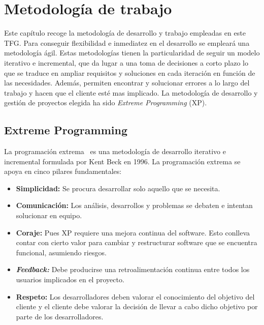 \chapter{Metodología de trabajo}
\label{cap:Metodologia}
Este capítulo recoge la metodología de desarrollo y trabajo empleadas en este \gls{TFG}. Para conseguir flexibilidad e inmediatez en el desarrollo se empleará una metodología ágil. Estas metodologías tienen la particularidad de seguir un modelo iterativo e incremental, que da lugar a una toma de decisiones a corto plazo lo que se traduce en ampliar requisitos y soluciones en cada iteración en función de las necesidades. Además, permiten encontrar y solucionar errores a lo largo del trabajo y hacen que el cliente esté mas implicado. La metodología de desarrollo y gestión de proyectos elegida ha sido \textit{Extreme Programming} (\gls{XP}).
\section{Extreme Programming}
La programación extrema~\cite{Newk02} es una metodología de desarrollo iterativo e incremental formulada por Kent Beck en 1996. La programación extrema se apoya en cinco pilares fundamentales:
\begin{itemize}
\item \textbf{Simplicidad:} Se procura desarrollar solo aquello que se necesita.
\item \textbf{Comunicación:} Los análisis, desarrollos y problemas se debaten e intentan solucionar en equipo.
\item \textbf{Coraje:} Pues \gls{XP} requiere una mejora continua del software. Esto conlleva contar con cierto valor para cambiar y restructurar software que se encuentra funcional, asumiendo riesgos.
\item \textbf{\textit{Feedback:}} Debe producirse una retroalimentación continua entre todos los usuarios implicados en el proyecto.
\item \textbf{Respeto:} Los desarrolladores deben valorar el conocimiento del objetivo del cliente y el cliente debe valorar la decisión de llevar a cabo dicho objetivo por parte de los desarrolladores.
\end{itemize}
